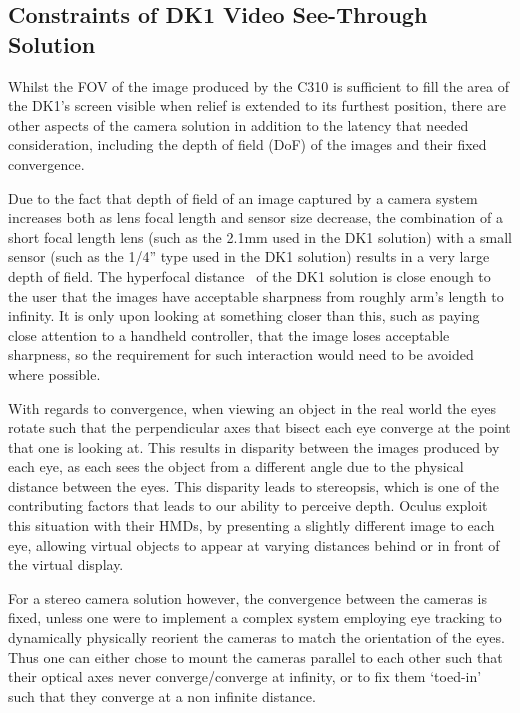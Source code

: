 
\subsection{Constraints of DK1 Video See-Through Solution}

\label{constraints_of_dk1_see_through_solution}

Whilst the FOV of the image produced by the C310 is sufficient to fill the area of the DK1's screen visible when relief is extended to its furthest position, there are other aspects of the camera solution in addition to the latency that needed consideration, including the depth of field (DoF) of the images and their fixed convergence.

Due to the fact that depth of field of an image captured by a camera system increases both as lens focal length and sensor size decrease, the combination of a short focal length lens (such as the 2.1mm used in the DK1 solution) with a small sensor (such as the 1/4'' type used in the DK1 solution) results in a very large depth of field. The hyperfocal distance~\cite{Kingslake1992} of the DK1 solution is close enough to the user that the images have acceptable sharpness from roughly arm's length to infinity. It is only upon looking at something closer than this, such as paying close attention to a handheld controller, that the image loses acceptable sharpness, so the requirement for such interaction would need to be avoided where possible.

With regards to convergence, when viewing an object in the real world the eyes rotate such that the perpendicular axes that bisect each eye converge at the point that one is looking at. This results in disparity between the images produced by each eye, as each sees the object from a different angle due to the physical distance between the eyes. This disparity leads to stereopsis, which is one of the contributing factors that leads to our ability to perceive depth. Oculus exploit this situation with their HMDs, by presenting a slightly different image to each eye, allowing virtual objects to appear at varying distances behind or in front of the virtual display.

For a stereo camera solution however, the convergence between the cameras is fixed, unless one were to implement a complex system employing eye tracking to dynamically physically reorient the cameras to match the orientation of the eyes. Thus one can either chose to mount the cameras parallel to each other such that their optical axes never converge/converge at infinity, or to fix them `toed-in' such that they converge at a non infinite distance.

